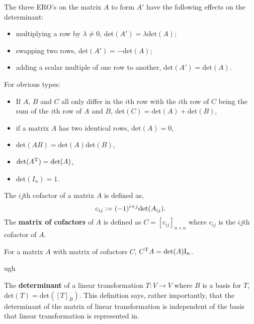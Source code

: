 \begin{definition}[EROs]
    The three ERO's on the matrix $A$ to form $A'$ have the following effects on the determinant: \begin{itemize}
        \item multiplying a row by $\lambda\neq0$, $\text{det}(A') = \lambda\text{det}(A)$;
        \item swapping two rows, $\text{det}(A') = -\text{det}(A)$;
        \item adding a scalar multiple of one row to another, $\text{det}(A') = \text{det}(A)$.
    \end{itemize}
\end{definition}

\begin{definition} For obvious types:
\begin{itemize}
    \item If $A$, $B$ and $C$ all only differ in the $i$th row with the $i$th row of $C$ being the sum of the $i$th row of $A$ and $B$, $\text{det}(C) = \text{det}(A) + \text{det}(B)$,
    \item if a matrix $A$ has two identical rows, $\text{det}(A)=0$,
    \item $\text{det}(AB)=\text{det}(A)\text{det}(B)$,
    \item $\text{det}(A^{\mathrm{T}}) = \text{det}(A)$,
    \item $\text{det}(I_n)=1$.
\end{itemize}
\end{definition}

\begin{definition}[Cofactor]
    The $ij$th cofactor of a matrix $A$ is defined as, \[
        c_{ij} := (-1)^{i+j}\text{det}(A_{ij})
        \textcolor{black}{.}
    \]
    The \textbf{matrix of cofactors} of $A$ is defined as $C=[c_{ij}]_{n\times n}$ where $c_{ij}$ is the $ij$th cofactor of $A$.
\end{definition}

\begin{theorem}
    For a matrix $A$ with matrix of cofactors $C$, $C^{\mathrm{T}} A = \text{det}(A)\mathrm{I}_n$.
\end{theorem}

\begin{theorem}
    ugh
\end{theorem}

\begin{definition}
    The \textbf{determinant} of a linear transformation $T:V\rightarrow V$ where $B$ is a basis for $T$, $\text{det}(T) = \text{det}([T]_B)$. This definition says, rather importantly, that the determinant of the matrix of linear transformation is independent of the basis that linear transformation is represented in.
\end{definition}

